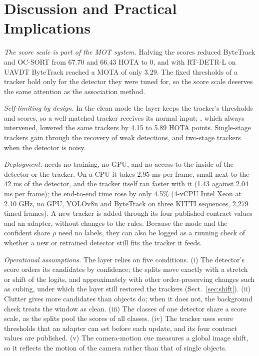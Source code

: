 \section{Discussion and Practical Implications}\label{sec:discussion}

\emph{The score scale is part of the MOT system.} Halving the scores reduced ByteTrack and OC-SORT
from 67.70 and 66.43 HOTA to 0, and with RT-DETR-L on UAVDT ByteTrack reached a MOTA of only 3.29.
The fixed thresholds of a tracker hold only for the detector they were tuned for, so the score
scale deserves the same attention as the association method.

\emph{Self-limiting by design.} In the clean mode the layer keeps the tracker's thresholds and
scores, so a well-matched tracker receives its normal input; \aob{}, which always intervened,
lowered the same trackers by 4.15 to 5.89 HOTA points. Single-stage trackers gain through the
recovery of weak detections, and two-stage trackers when the detector is noisy.

\emph{Deployment.} \scl{} needs no training, no GPU, and no access to the inside of the detector or
the tracker. On a CPU it takes 2.95 ms per frame, small next to the 42 ms of the detector, and the
tracker itself ran faster with it (1.43 against 2.04 ms per frame); the end-to-end time rose by
only 4.5\% (4-vCPU Intel Xeon at 2.10 GHz, no GPU, YOLOv8n and ByteTrack on three KITTI sequences,
2,279 timed frames). A new tracker is added through its four published contract
values and an adapter, without changes to the rules. Because the mode and the confident share
$\rho$ need no labels, they can also be logged as a running check of whether a new or retrained
detector still fits the tracker it feeds.

\emph{Operational assumptions.} The layer relies on five conditions. (i) The detector's score
orders its candidates by confidence; the splits move exactly with a stretch or shift of the
logits, and approximately with other order-preserving changes such as cubing, under which the
layer still restored the trackers (Sect.~\ref{sec:shift}). (ii) Clutter gives more candidates
than objects do; when it does not, the background check treats the window as clean. (iii) The
classes of one detector share a score scale, as the splits pool the scores of all classes. (iv)
The tracker uses score thresholds that an adapter can set before each update, and its four
contract values are published. (v) The camera-motion cue measures a global image shift, so it
reflects the motion of the camera rather than that of single objects.

